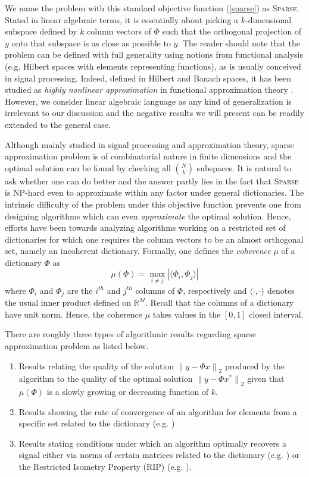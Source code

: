 \documentclass[11pt]{article}
\begin{document}
\noindent We name the problem with this standard objective
function (\ref{sparse}) as \textsc{Sparse}. Stated in linear
algebraic terms, it is essentially about picking a $k$-dimensional
subspace defined by $k$ column vectors of $\Phi$ such that the
orthogonal projection of $y$ onto that subspace is as close as
possible to $y$. The reader should note that the problem can be
defined with full generality using notions from functional
analysis (e.g. Hilbert spaces with elements representing
functions), as is usually conceived in signal processing. Indeed,
defined in Hilbert and Banach spaces, it has been studied as
\emph{highly nonlinear approximation} in functional approximation
theory \cite{Temlyakov1,Temlyakov2}. However, we consider linear
algebraic language as any kind of generalization is irrelevant to
our discussion and the negative results we will present can be
readily extended to the general case.

Although mainly studied in signal processing and approximation
theory, sparse approximation problem is of combinatorial nature in
finite dimensions and the optimal solution can be found by
checking all $\binom{N}{k}$ subspaces. It is natural to ask
whether one can do better and the answer partly lies in the fact
that \textsc{Sparse} is \textsf{NP}-hard even to approximate within any
factor \cite{Davis,Natarajan} under general dictionaries. The
intrinsic difficulty of the problem under this objective function
prevents one from designing algorithms which can even
\emph{approximate} the optimal solution. Hence, efforts have been
towards analyzing algorithms working on a restricted set of
dictionaries for which one requires the column vectors to be an
almost orthogonal set, namely an incoherent dictionary. Formally,
one defines the \emph{coherence} $\mu$ of a dictionary $\Phi$ as
$$
\mu(\Phi) = \max_{i\neq j} | \langle\Phi_i,\Phi_j\rangle |
$$
\noindent where $\Phi_i$ and $\Phi_j$ are the $i^{th}$ and
$j^{th}$ columns of $\Phi$, respectively and
$\langle\cdot,\cdot\rangle$ denotes the usual inner product defined on
$\mathbb{R}^{M}$. Recall that the columns of a dictionary have
unit norm. Hence, the coherence $\mu$ takes values in the $[0,1]$
closed interval.

There are roughly three types of algorithmic results regarding
sparse approximation problem as listed below.
\begin{enumerate}
\item Results relating the quality of the solution ${\|y-\Phi
x\|}_2$ produced by the algorithm to the quality of the optimal
solution ${\|y-\Phi x^*\|}_2$ given that $\mu(\Phi)$ is a slowly
growing or decreasing function of $k$.

\item Results showing the rate of convergence of an algorithm for
elements from a specific set related to the dictionary (e.g.
\cite{Liu-T})

\item Results stating conditions under which an algorithm
optimally recovers a signal either via norms of certain matrices
related to the dictionary (e.g. \cite{Tropp}) or the Restricted
Isometry Property (RIP) (e.g. \cite{Davenport}).
\end{enumerate}
\end{document}
